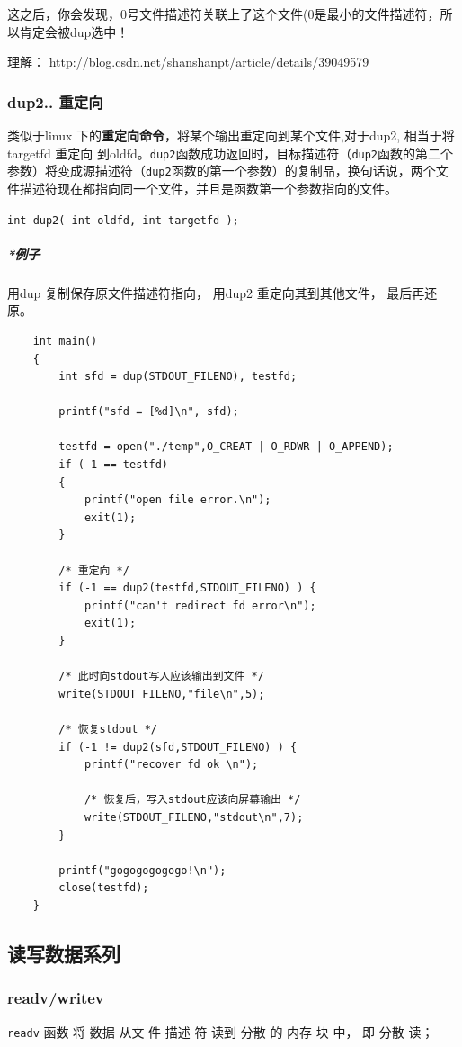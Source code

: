 \documentclass[UTF8,a4paper,12pt]{ctexbook}
\begin{document}
				这之后，你会发现，0号文件描述符关联上了这个文件(0是最小的文件描述符，所以肯定会被dup选中！
				
				理解： \url{http://blog.csdn.net/shanshanpt/article/details/39049579}
				
			\subsubsection{dup2.. 重定向}
				类似于linux 下的\textbf{重定向命令}，将某个输出重定向到某个文件,对于dup2, 相当于将targetfd 重定向 到oldfd。\verb|dup2|函数成功返回时，目标描述符（\verb|dup2|函数的第二个参数）将变成源描述符（\verb|dup2|函数的第一个参数）的复制品，换句话说，两个文件描述符现在都指向同一个文件，并且是函数第一个参数指向的文件。
				
				\verb|int dup2( int oldfd, int targetfd );|
				
				\subparagraph{*例子} 用dup 复制保存原文件描述符指向， 用dup2 重定向其到其他文件， 最后再还原。
					\begin{lstlisting}
	int main()  
	{  
		int sfd = dup(STDOUT_FILENO), testfd;  
		
		printf("sfd = [%d]\n", sfd);  
		
		testfd = open("./temp",O_CREAT | O_RDWR | O_APPEND);  
		if (-1 == testfd)  
		{  
			printf("open file error.\n");  
			exit(1);  
		}  
		
		/* 重定向 */  
		if (-1 == dup2(testfd,STDOUT_FILENO) ) {  
			printf("can't redirect fd error\n");  
			exit(1);  
		}  
		
		/* 此时向stdout写入应该输出到文件 */  
		write(STDOUT_FILENO,"file\n",5);  
		
		/* 恢复stdout */  
		if (-1 != dup2(sfd,STDOUT_FILENO) ) {  
			printf("recover fd ok \n");  
			
			/* 恢复后，写入stdout应该向屏幕输出 */  
			write(STDOUT_FILENO,"stdout\n",7);  
		}  
		
		printf("gogogogogogo!\n");  
		close(testfd);  
	}  
					\end{lstlisting}
				
		\subsection{读写数据系列}
			\subsubsection{readv/writev}
				\verb|readv| 函数 将 数据 从文 件 描述 符 读到 分散 的 内存 块 中， 即 分散 读； 
				
\end{document}
